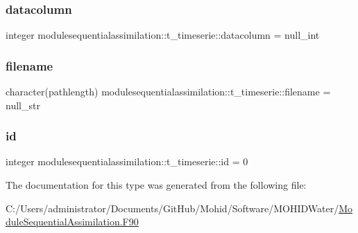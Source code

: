 \subsubsection{\texorpdfstring{datacolumn}{datacolumn}}
{\footnotesize\ttfamily integer modulesequentialassimilation\+::t\+\_\+timeserie\+::datacolumn = null\+\_\+int\hspace{0.3cm}{\ttfamily [private]}}

\mbox{\label{structmodulesequentialassimilation_1_1t__timeserie_adfe5164a6b06bbef23f3ab32ce09be84}} 
\subsubsection{\texorpdfstring{filename}{filename}}
{\footnotesize\ttfamily character(pathlength) modulesequentialassimilation\+::t\+\_\+timeserie\+::filename = null\+\_\+str\hspace{0.3cm}{\ttfamily [private]}}

\mbox{\label{structmodulesequentialassimilation_1_1t__timeserie_a7fc9b94386349e82d50d9298d932df45}} 
\subsubsection{\texorpdfstring{id}{id}}
{\footnotesize\ttfamily integer modulesequentialassimilation\+::t\+\_\+timeserie\+::id = 0\hspace{0.3cm}{\ttfamily [private]}}



The documentation for this type was generated from the following file\+:\begin{DoxyCompactItemize}
\item 
C\+:/\+Users/administrator/\+Documents/\+Git\+Hub/\+Mohid/\+Software/\+M\+O\+H\+I\+D\+Water/\mbox{\hyperlink{_module_sequential_assimilation_8_f90}{Module\+Sequential\+Assimilation.\+F90}}\end{DoxyCompactItemize}
